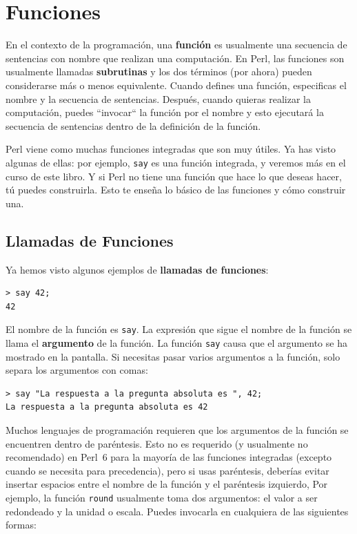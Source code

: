 \chapter{Funciones}
\label{funcchap}

En el contexto de la programación, una {\bf función}
es usualmente una secuencia de sentencias con nombre
que realizan una computación. En Perl, las funciones
son usualmente llamadas {\bf subrutinas} y los dos términos
(por ahora) pueden considerarse  más o menos equivalente. Cuando defines
una función, especificas el nombre y la secuencia de sentencias.
Después, cuando quieras realizar la computación, puedes 
``invocar`` la función por el nombre y esto ejecutará la secuencia
de sentencias dentro de la definición de la función.

Perl viene como muchas funciones integradas que son muy útiles.
Ya has visto algunas de ellas: por ejemplo, {\tt say} es una función 
integrada, y veremos más en el curso de este libro. Y si Perl no tiene
una función que hace lo que deseas hacer, tú puedes construirla. Esto
te enseña lo básico de las funciones y cómo construir una.

\section{Llamadas de Funciones}
\label{functionchap}

Ya hemos visto algunos ejemplos de {\bf llamadas de funciones}:

\begin{lstlisting}
> say 42;
42
\end{lstlisting}
%
El nombre de la función es {\tt say}. La expresión que sigue el
nombre de la función se llama el {\bf argumento} de la función.
La función {\tt say} causa que el argumento se ha mostrado en 
la pantalla. Si necesitas pasar varios argumentos a la función, 
solo separa los argumentos con comas:

\begin{lstlisting}
> say "La respuesta a la pregunta absoluta es ", 42;
La respuesta a la pregunta absoluta es 42
\end{lstlisting}
%

Muchos lenguajes de programación requieren que los argumentos de
la función se encuentren dentro de paréntesis. Esto no es requerido
(y usualmente no recomendado) en Perl~6 para la mayoría de 
las funciones integradas (excepto cuando se necesita para 
precedencia), pero si usas paréntesis, deberías evitar insertar 
espacios entre el nombre de la función y el paréntesis izquierdo,
Por ejemplo, la función {\tt round} usualmente toma dos argumentos:
el valor a ser redondeado y la unidad o escala.
Puedes invocarla en cualquiera de las siguientes formas:

